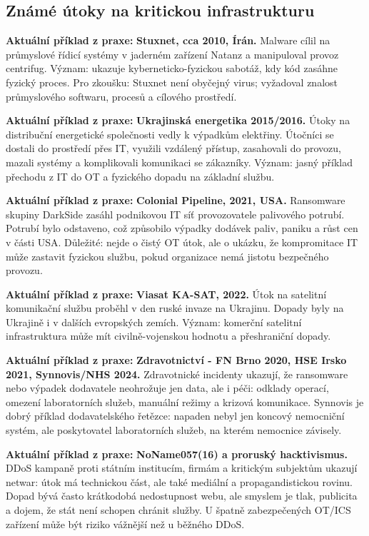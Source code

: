 \documentclass[11pt,a4paper]{article}
\newcommand{\aktualni}[1]{\begin{tcolorbox}[breakable,enhanced,colback=green!10,colframe=green!35!black,boxrule=0pt,arc=1mm,left=5pt,right=5pt,top=5pt,bottom=5pt,before skip=6pt,after skip=6pt]\textbf{Aktuální příklad z praxe:} #1\end{tcolorbox}}
\begin{document}
\subsection*{Známé útoky na kritickou infrastrukturu}
\aktualni{\textbf{Stuxnet, cca 2010, Írán.} Malware cílil na průmyslové řídicí systémy v jaderném zařízení Natanz a manipuloval provoz centrifug. Význam: ukazuje kyberneticko-fyzickou sabotáž, kdy kód zasáhne fyzický proces. Pro zkoušku: Stuxnet není obyčejný virus; vyžadoval znalost průmyslového softwaru, procesů a cílového prostředí.}

\aktualni{\textbf{Ukrajinská energetika 2015/2016.} Útoky na distribuční energetické společnosti vedly k výpadkům elektřiny. Útočníci se dostali do prostředí přes IT, využili vzdálený přístup, zasahovali do provozu, mazali systémy a komplikovali komunikaci se zákazníky. Význam: jasný příklad přechodu z IT do OT a fyzického dopadu na základní službu.}

\aktualni{\textbf{Colonial Pipeline, 2021, USA.} Ransomware skupiny DarkSide zasáhl podnikovou IT síť provozovatele palivového potrubí. Potrubí bylo odstaveno, což způsobilo výpadky dodávek paliv, paniku a růst cen v části USA. Důležité: nejde o čistý OT útok, ale o ukázku, že kompromitace IT může zastavit fyzickou službu, pokud organizace nemá jistotu bezpečného provozu.}

\aktualni{\textbf{Viasat KA-SAT, 2022.} Útok na satelitní komunikační službu proběhl v den ruské invaze na Ukrajinu. Dopady byly na Ukrajině i v dalších evropských zemích. Význam: komerční satelitní infrastruktura může mít civilně-vojenskou hodnotu a přeshraniční dopady.}

\aktualni{\textbf{Zdravotnictví - FN Brno 2020, HSE Irsko 2021, Synnovis/NHS 2024.} Zdravotnické incidenty ukazují, že ransomware nebo výpadek dodavatele neohrožuje jen data, ale i péči: odklady operací, omezení laboratorních služeb, manuální režimy a krizová komunikace. Synnovis je dobrý příklad dodavatelského řetězce: napaden nebyl jen koncový nemocniční systém, ale poskytovatel laboratorních služeb, na kterém nemocnice závisely.}

\aktualni{\textbf{NoName057(16) a proruský hacktivismus.} DDoS kampaně proti státním institucím, firmám a kritickým subjektům ukazují netwar: útok má technickou část, ale také mediální a propagandistickou rovinu. Dopad bývá často krátkodobá nedostupnost webu, ale smyslem je tlak, publicita a dojem, že stát není schopen chránit služby. U špatně zabezpečených OT/ICS zařízení může být riziko vážnější než u běžného DDoS.}
\end{document}
